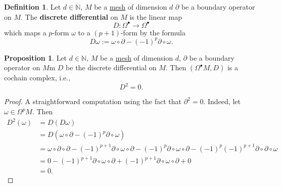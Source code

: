 \documentclass[fleqn]{article}
\theoremstyle{definition}
\newtheorem{proposition}[theorem]{Proposition}
\newtheorem{definition}[theorem]{Definition}
\newcommand{\N}{\mathbb{N}}
\begin{document}
\begin{definition}
  Let
    $d \in \N$,
    $M$ be a \hyperref[idec:mesh:definition]{mesh} of dimension $d$
    $\partial$ be a boundary operator on $M$.
  The \textbf{discrete differential} on $M$ is the linear map
  \begin{equation}
    D \colon \Omega^\bullet \to \Omega^\bullet
  \end{equation}
  which maps a $p$-form $\omega$ to a $(p + 1)$-form by the formula
  \begin{equation}
    D \omega := \omega \circ \partial - (-1)^p \partial \circ \omega.
  \end{equation}
\end{definition}

\begin{proposition}
  Let
    $d \in \N$,
    $M$ be a \hyperref[idec:mesh:definition]{mesh} of dimension $d$,
    $\partial$ be a boundary operator on $M$m
    $D$ be the discrete differential on $M$.
  Then $(\Omega^\bullet M, D)$ is a cochain complex, i.e.,
  \begin{equation}
    D^2 = 0.
  \end{equation}
\end{proposition}

\begin{proof}
  A straightforward computation using the fact that $\partial^2 = 0$.
  Indeed, let $\omega \in \Omega^p M$.
  Then
  \begin{equation}
    \begin{split}
      D^2(\omega)
      & = D(D \omega) \\
      & = D(\omega \circ \partial - (-1)^p \partial \circ \omega) \\
      & =
      \omega \circ \partial \circ \partial
        - (-1)^{p + 1} \partial \circ \omega \circ \partial
        - (-1)^p \partial \circ \omega \circ \partial
        - (-1)^p (-1)^{p + 1} \partial \circ \partial \circ \omega \\
      & =
      0
      - (-1)^{p + 1}\partial \circ \omega \circ \partial
      + (-1)^{p + 1}\partial \circ \omega \circ \partial
      + 0 \\
      & = 0.
    \end{split}
  \end{equation}
\end{proof}
\end{document}
